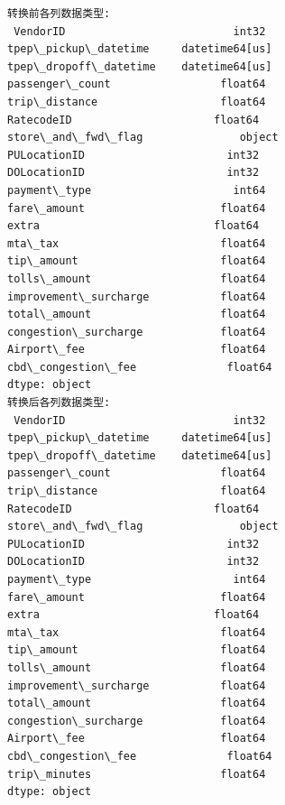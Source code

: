 \documentclass[11pt]{article}
\begin{document}
    \begin{Verbatim}[commandchars=\\\{\}]
转换前各列数据类型:
 VendorID                          int32
tpep\_pickup\_datetime     datetime64[us]
tpep\_dropoff\_datetime    datetime64[us]
passenger\_count                 float64
trip\_distance                   float64
RatecodeID                      float64
store\_and\_fwd\_flag               object
PULocationID                      int32
DOLocationID                      int32
payment\_type                      int64
fare\_amount                     float64
extra                           float64
mta\_tax                         float64
tip\_amount                      float64
tolls\_amount                    float64
improvement\_surcharge           float64
total\_amount                    float64
congestion\_surcharge            float64
Airport\_fee                     float64
cbd\_congestion\_fee              float64
dtype: object
转换后各列数据类型:
 VendorID                          int32
tpep\_pickup\_datetime     datetime64[us]
tpep\_dropoff\_datetime    datetime64[us]
passenger\_count                 float64
trip\_distance                   float64
RatecodeID                      float64
store\_and\_fwd\_flag               object
PULocationID                      int32
DOLocationID                      int32
payment\_type                      int64
fare\_amount                     float64
extra                           float64
mta\_tax                         float64
tip\_amount                      float64
tolls\_amount                    float64
improvement\_surcharge           float64
total\_amount                    float64
congestion\_surcharge            float64
Airport\_fee                     float64
cbd\_congestion\_fee              float64
trip\_minutes                    float64
dtype: object
    \end{Verbatim}
\end{document}

